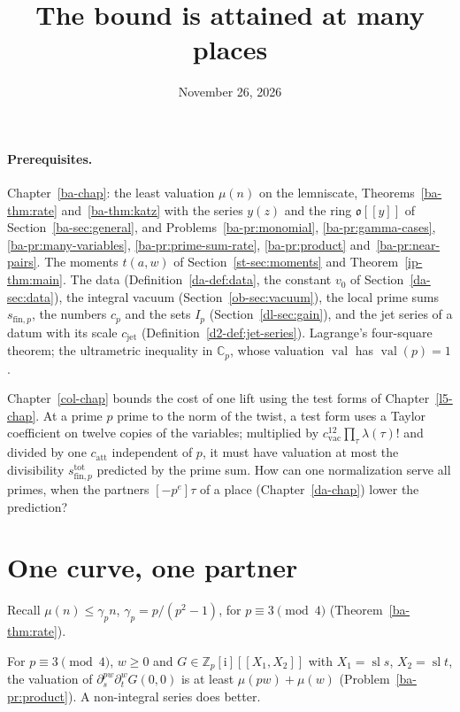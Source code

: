 \documentclass[reqno]{amsart}
\title{The bound is attained at many places}
\author{}
\date{November 26, 2026}
\newcounter{chap}
\theoremstyle{definition}
\theoremstyle{plain}
\newcommand{\Z}{\mathbb{Z}}
\newcommand{\C}{\mathbb{C}}
\newcommand{\ii}{\mathrm{i}}
\newcommand{\sll}{\operatorname{sl}}
\newcommand{\val}{\operatorname{val}}
\newcommand{\sfp}{s_{\mathrm{fin},p}}
\newcommand{\stot}{s^{\mathrm{tot}}_{\mathrm{fin},p}}
\newcommand{\cvac}{c_{\mathrm{vac}}}
\newcommand{\catt}{c_{\mathrm{att}}}
\newcommand{\cjet}{c_{\mathrm{jet}}}
\newcommand{\oo}{\mathfrak o}
\begin{document}
\maketitle
{}\label{chap}

\paragraph{Prerequisites.}
Chapter~\ref{ba-chap}: the least valuation \(\mu(n)\) on the lemniscate, Theorems~\ref{ba-thm:rate} and~\ref{ba-thm:katz} with the series \(y(z)\) and the ring \(\oo[[y]]\) of Section~\ref{ba-sec:general}, and Problems~\ref{ba-pr:monomial}, \ref{ba-pr:gamma-cases}, \ref{ba-pr:many-variables}, \ref{ba-pr:prime-sum-rate}, \ref{ba-pr:product} and~\ref{ba-pr:near-pairs}.  The moments \(t(a,w)\) of Section~\ref{st-sec:moments} and Theorem~\ref{ip-thm:main}.  The data (Definition~\ref{da-def:data}, the constant \(v_0\) of Section~\ref{da-sec:data}), the integral vacuum (Section~\ref{ob-sec:vacuum}), the local prime sums \(\sfp\), the numbers \(c_p\) and the sets \(I_p\) (Section~\ref{dl-sec:gain}), and the jet series of a datum with its scale \(\cjet\) (Definition~\ref{d2-def:jet-series}).  Lagrange's four-square theorem; the ultrametric inequality in \(\C_p\), whose valuation \(\val\) has \(\val(p) = 1\).

\medskip
Chapter~\ref{col-chap} bounds the cost of one lift using the test forms of Chapter~\ref{l5-chap}.  At a prime \(p\) prime to the norm of the twist, a test form uses a Taylor coefficient on twelve copies of the variables; multiplied by \(\cvac^{12}\prod_\tau\lambda(\tau)!\) and divided by one \(\catt\) independent of \(p\), it must have valuation at most the divisibility \(\stot\) predicted by the prime sum.  How can one normalization serve all primes, when the partners \([-p^e]\tau\) of a place (Chapter~\ref{da-chap}) lower the prediction?

\section{One curve, one partner}\label{sec:lemniscate}

Recall \(\mu(n) \le \gamma_p n\), \(\gamma_p = p/(p^2-1)\), for \(p \equiv 3 \pmod 4\) (Theorem~\ref{ba-thm:rate}).

For \(p \equiv 3 \pmod 4\), \(w \ge 0\) and \(G \in \Z_p[\ii][[X_1, X_2]]\) with \(X_1 = \sll s\), \(X_2 = \sll t\), the valuation of \(\partial_s^{pw}\partial_t^w G(0,0)\) is at least \(\mu(pw) + \mu(w)\) (Problem~\ref{ba-pr:product}).  A non-integral series does better.
\end{document}
